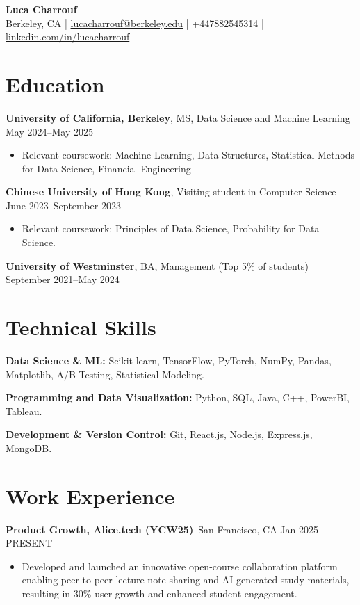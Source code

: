 \documentclass{article}
\begin{document}
\begin{center}
    \textbf{\Large Luca Charrouf}\\
    \vspace{0.2cm}
    Berkeley, CA | \href{mailto:lucacharrouf@berkeley.edu}{lucacharrouf@berkeley.edu} | +447882545314 | \href{https://linkedin.com/in/lucacharrouf}{linkedin.com/in/lucacharrouf}
\end{center}

\section*{Education}
\textbf{University of California, Berkeley}, MS, Data Science and Machine Learning \hfill May 2024--May 2025
\begin{itemize}[leftmargin=*,noitemsep]
    \item Relevant coursework: Machine Learning, Data Structures, Statistical Methods for Data Science, Financial Engineering
\end{itemize}

\textbf{Chinese University of Hong Kong}, Visiting student in Computer Science \hfill June 2023--September 2023
\begin{itemize}[leftmargin=*,noitemsep]
    \item Relevant coursework: Principles of Data Science, Probability for Data Science.
\end{itemize}

\textbf{University of Westminster}, BA, Management (Top 5\% of students) \hfill September 2021--May 2024

\section*{Technical Skills}
\textbf{Data Science \& ML:} Scikit-learn, TensorFlow, PyTorch, NumPy, Pandas, Matplotlib, A/B Testing, Statistical Modeling.

\textbf{Programming and Data Visualization:} Python, SQL, Java, C++, PowerBI, Tableau.

\textbf{Development \& Version Control:} Git, React.js, Node.js, Express.js, MongoDB.

\section*{Work Experience}
\textbf{Product Growth, Alice.tech (YCW25)}--San Francisco, CA \hfill Jan 2025--PRESENT
\begin{itemize}[leftmargin=*,noitemsep]
    \item Developed and launched an innovative open-course collaboration platform enabling peer-to-peer lecture note sharing and AI-generated study materials, resulting in 30\% user growth and enhanced student engagement.
\end{itemize}
\end{document}

